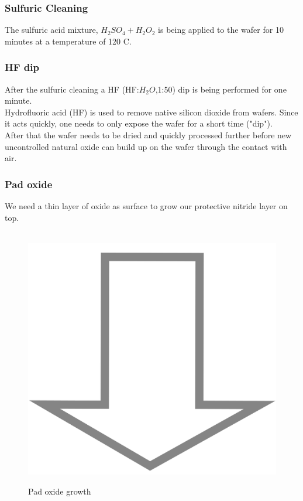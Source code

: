 \subsubsection{Sulfuric Cleaning}
The sulfuric acid mixture, $H_2 S O_4 + H_2 O_2$ is being applied to the wafer for 10 minutes at a temperature of 120 \degree C.

\subsubsection{HF dip}
After the sulfuric cleaning a HF (HF:$H_2O$,1:50) dip is being performed for one minute. \\
Hydrofluoric acid (HF) is used to remove native silicon dioxide from wafers. Since it acts quickly, one needs to only expose the wafer for a short time ("dip"). \\
After that the wafer needs to be dried and quickly processed further before new uncontrolled natural oxide can build up on the wafer through the contact with air.

\subsubsection{Pad oxide}
We need a thin layer of oxide as surface to grow our protective nitride layer on top.

\begin{figure}[H]
	\centering
	\begin{tikzpicture}[node distance = 3cm, auto, thick,scale=\CrossSectionOnly, every node/.style={transform shape}]
		
	\end{tikzpicture} \\
	\includegraphics[scale=0.01]{down_arrow.png} \\
	\begin{tikzpicture}[node distance = 3cm, auto, thick,scale=\CrossSectionOnly, every node/.style={transform shape}]
		
	\end{tikzpicture}
	\caption{Pad oxide growth}
\end{figure}

